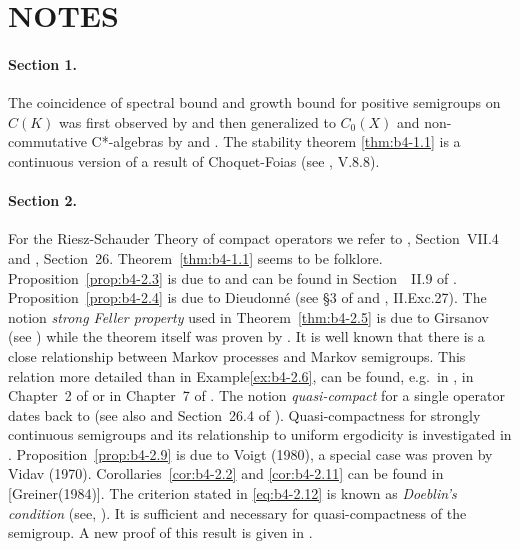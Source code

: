 \section*{NOTES}

\paragraph{Section 1.} The coincidence of spectral bound and growth bound for positive semigroups on $C(K)$ was first observed by \citet{derndinger:1980} and then generalized to $C_0(X)$ and non-commutative C*-algebras by \citet{battydavies:1983} and \citet{grohneubrander:1981}. 
The stability theorem \ref{thm:b4-1.1} is a continuous version of a result of Choquet-Foias (see \citet{schaefer:1974}, V.8.8).

\paragraph{Section 2.} For the Riesz-Schauder Theory of compact operators we refer to \citet{dunfordschwartz:1958}, Section~VII.4 and \citet{pietsch:1978}, Section~26. 
Theorem~\ref{thm:b4-1.1} seems to be folklore. Proposition~\ref{prop:b4-2.3} is due to \citet{grothendieck:1953} and can be found in Section~~II.9 of \citet{schaefer:1974}. Proposition~\ref{prop:b4-2.4} is due to Dieudonné (see §3 of \citet{grothendieck:1953} and \citet{schaefer:1974}, II.Exc.27). The notion \emph{strong Feller property} used in Theorem~\ref{thm:b4-2.5} is due to Girsanov (see \citet{dynkin:1965}) while the theorem itself was proven by \citet{davies:1982}. 
It is well known that there is a close relationship between Markov processes and Markov semigroups. 
This relation more detailed than in Example\ref{ex:b4-2.6}, can be found, e.g.\ in \citet{dynkin:1965}, in Chapter~2 of \citet{vancasteren:1985} or in Chapter~7 of \citet{lamperti:1977}. 
The notion \emph{quasi-compact} for a single operator dates back to \citet{eberlein:1948} (see also \citet{yosidakakutani:1941} and Section~26.4 of \citet{pietsch:1978}). 
Quasi-compactness for strongly continuous semigroups and its relationship to uniform ergodicity is investigated in \citet{lin:1975}. 
Proposition~\ref{prop:b4-2.9} is due to Voigt (1980), a special case was proven by Vidav (1970). 
Corollaries~\ref{cor:b4-2.2} and \ref{cor:b4-2.11} can be found in [Greiner(1984)]. 
The criterion stated in \eqref{eq:b4-2.12} is known as \emph{Doeblin's condition} (see, \eg \citet{yosidakakutani:1941}). It is sufficient and
%
%
necessary for quasi-compactness of the semigroup. 
A new proof of this result is given in \citet{lotz:1981}.

